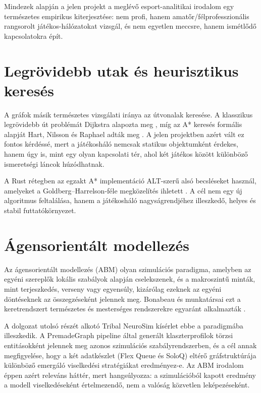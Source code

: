 Mindezek alapján a jelen projekt a meglévő esport-analitikai irodalom egy természetes empirikus kiterjesztése: nem profi, hanem amatőr/félprofesszionális rangsorolt játékos-hálózatokat vizsgál, és nem egyetlen meccsre, hanem ismétlődő kapcsolatokra épít.

\section{Legrövidebb utak és heurisztikus keresés}

A gráfok másik természetes vizsgálati iránya az útvonalak keresése. A klasszikus legrövidebb út problémát Dijkstra alapozta meg \cite{dijkstra1959}, míg az A* keresés formális alapját Hart, Nilsson és Raphael adták meg \cite{hart1968}. A jelen projektben azért vált ez fontos kérdéssé, mert a játékosháló nemcsak statikus objektumként érdekes, hanem úgy is, mint egy olyan kapcsolati tér, ahol két játékos között különböző ismeretségi láncok húzódhatnak.

A Rust rétegben az egzakt A* implementáció ALT-szerű alsó becsléseket használ, amelyeket a Goldberg--Harrelson-féle megközelítés ihletett \cite{goldberg2005}. A cél nem egy új algoritmus feltalálása, hanem a játékosháló nagyságrendjéhez illeszkedő, helyes és stabil futtatókörnyezet.

\section{Ágensorientált modellezés}

Az ágensorientált modellezés (ABM) olyan szimulációs paradigma, amelyben az egyéni szereplők lokális szabályok alapján cselekszenek, és a makroszintű minták, mint terjeszkedés, verseny vagy egyensúly, kizárólag ezeknek az egyéni döntéseknek az összegzéseként jelennek meg. Bonabeau és munkatársai ezt a keretrendszert természetes és mesterséges rendszerekre egyaránt alkalmazták \cite{bonabeau2002}.

A dolgozat utolsó részét alkotó Tribal NeuroSim kísérlet ebbe a paradigmába illeszkedik. A PremadeGraph pipeline által generált klaszterprofilok törzsi entitásokként jelennek meg azonos szimulációs szabályrendszerben, és a cél annak megfigyelése, hogy a két adatkészlet (Flex Queue és SoloQ) eltérő gráfstruktúrája különböző emergáló viselkedési stratégiákat eredményez-e. Az ABM irodalom éppen azért releváns háttér, mert hangsúlyozza: a szimulációból kapott eredmény a modell viselkedéseként értelmezendő, nem a valóság közvetlen leképezéseként.
